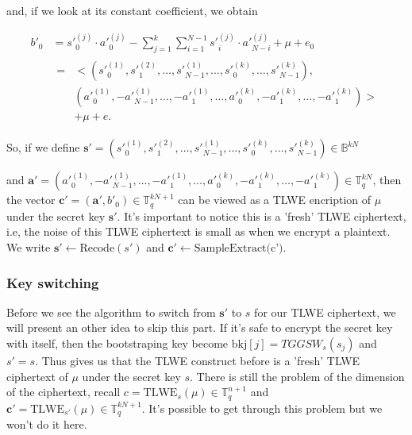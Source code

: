 \documentclass{article}
\newcommand{\T}{\mathbb{T}}
\newcommand{\B}{\mathbb{B}}
\theoremstyle{definition}
\theoremstyle{Theorem}
\begin{document}
and, if we look at its constant coefficient, we obtain 

\begin{equation}
\begin{split}
    b'_0 &= s'^{(j)} _{0} \cdot a'^{(j)}_{0} -\sum_{j=1}^k \sum_{i=1}^{N-1}s'^{(j)} _{i} \cdot a'^{(j)}_{N-i} + \mu + e_0\\
    &
    \begin{split}
        = &<(s'^{(1)}_0,s'^{(2)}_1,\ldots,s'^{(1)}_{N-1},\ldots,s'^{(k)}_0,\ldots,s'^{(k)}_{N-1}),\\
        &(a'^{(1)}_{0}, -a'^{(1)}_{N-1},\ldots,-a'^{(1)}_1,\ldots,a'^{(k)}_0,-a'^{(k)}_1,\ldots,-a'^{(k)}_1)> \\
        &+ \mu + e.
    \end{split}
\end{split}
\end{equation}

So, if we define $\mathbf{s'} = (s'^{(1)}_0,s'^{(2)}_1,\ldots,s'^{(1)}_{N-1},\ldots,s'^{(k)}_0,\ldots,s'^{(k)}_{N-1}) \in\B^{kN}$ 

and $\mathbf{a'} = (a'^{(1)}_{0}, -a'^{(1)}_{N-1},\ldots,-a'^{(1)}_1,\ldots,a'^{(k)}_0,-a'^{(k)}_1,\ldots,-a'^{(k)}_1) \in\T^{kN}_q$, then the vector $\mathbf{c'} = (\mathbf{a'},b'_0) \in \T^{kN + 1}_q$ can be viewed as a TLWE encription of $\mu$ under the secret key $\mathbf{s'}$. It's important to notice this is a 'fresh' TLWE ciphertext, i.e, the noise of this TLWE ciphertext is small as when we encrypt a plaintext. We write $\mathbf{s'}\gets\text{Recode}(s')$ and $\mathbf{c'} \gets \text{SampleExtract(c')}$. 

\subsubsection{Key switching} \label{key switching}

Before we see the algorithm to switch from $\mathbf{s'}$ to $s$ for our TLWE ciphertext, we will present an other idea to skip this part. If it's safe to encrypt the secret key with itself, then the bootstraping key become $\text{bkj}[j] = TGGSW_{s}(s_j)$ and $s'=s$. Thus gives us that the TLWE construct before is a 'fresh' TLWE ciphertext  of $\mu$ under the secret key $s$. There is still the problem of the dimension of the ciphertext, recall $c = \text{TLWE}_s(\mu)\in\T_q^{n+1}$ and $\mathbf{c'} = \text{TLWE}_{s'}(\mu)\in\T_q^{kN+1}$. It's possible to get through this problem but we won't do it here. 
\end{document}
